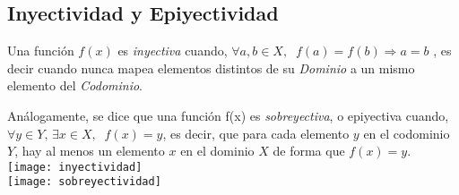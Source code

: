 \subsection{Inyectividad y Epiyectividad}
Una función $f(x)$ es \textit{inyectiva} cuando,
$\forall a,b \in X, \;\; f(a)=f(b) \Rightarrow a=b$
, es decir cuando nunca mapea elementos distintos de su \textit{Dominio} a un mismo elemento del \textit{Codominio}.

Análogamente, se dice que una función f(x) es \textit{sobreyectiva}, o epiyectiva cuando, $\forall y \in Y, \, \exists x \in X, \;\; f(x)=y$, es decir, que para cada elemento $y$ en el codominio $Y$, hay al menos un elemento $x$ en el dominio $X$ de forma que $f(x) = y$.\\
\texttt{[image: inyectividad]}\\
\texttt{[image: sobreyectividad]}
